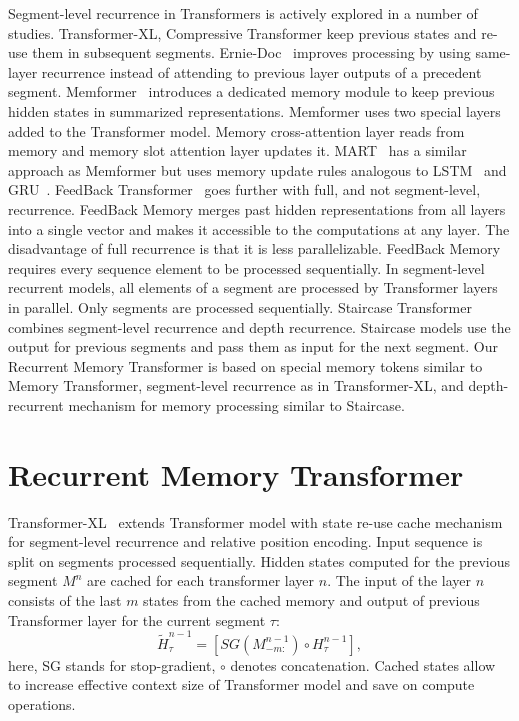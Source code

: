   Segment-level recurrence in Transformers is actively explored in a number of studies. Transformer-XL, Compressive Transformer keep previous states and re-use them in subsequent segments. Ernie-Doc~\cite{ding-etal-2021-ernie-doc} improves processing by using same-layer recurrence instead of attending to previous layer outputs of a precedent segment. Memformer~\cite{wu2020memformer} introduces a dedicated memory module to keep previous hidden states in summarized representations. Memformer uses two special layers added to the Transformer model. Memory cross-attention layer reads from memory and memory slot attention layer updates it. MART~\cite{lei2020mart} has a similar approach as Memformer but uses memory update rules analogous to LSTM~\cite{10.1162/neco.1997.9.8.1735} and GRU~\cite{cho2014gru}. FeedBack Transformer~\cite{fan2020feedback-transformer} goes further with full, and not segment-level, recurrence. FeedBack Memory merges past hidden representations from all layers into a single vector and makes it accessible to the computations at any layer. The disadvantage of full recurrence is that it is less parallelizable. FeedBack Memory requires every sequence element to be processed sequentially. In segment-level recurrent models, all elements of a segment are processed by Transformer layers in parallel. Only segments are processed sequentially. Staircase Transformer~\cite{ju2021staircase} combines segment-level recurrence and depth recurrence. Staircase models use the output for previous segments and pass them as input for the next segment. Our Recurrent Memory Transformer is based on special memory tokens similar to Memory Transformer, segment-level recurrence as in Transformer-XL, and depth-recurrent mechanism for memory processing similar to Staircase.
  
  \section{Recurrent Memory Transformer}
  
  Transformer-XL~\cite{dai2019transformerxl} extends Transformer model with state re-use cache mechanism for segment-level recurrence and relative position encoding. Input sequence is split on segments processed sequentially. Hidden states computed for the previous segment $M^{n}$ are cached for each transformer layer $n$. The input of the layer $n$ consists of the last $m$ states from the cached memory and output of previous Transformer layer for the current segment $\tau$:
  \begin{equation*}
  \tilde{H}^{n-1}_{\tau} = [ SG(M^{n-1}_{-m:}) \circ H^{n-1}_\tau ],
  \end{equation*}
  here, SG stands for stop-gradient, $\circ$ denotes concatenation. Cached states allow to increase effective context size of Transformer model and save on compute operations.
  
